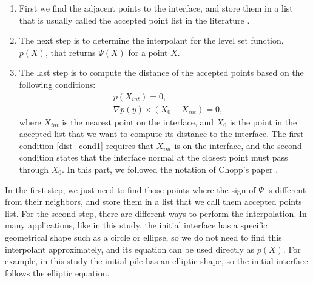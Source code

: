 \documentclass[review]{elsarticle}
\begin{document}
\begin{enumerate}
\item First we find the adjacent points to the interface, and store them in a list that is usually called the accepted point list in the literature \cite{Chopp2001}. 
\item The next step is to determine the interpolant for the level set function, $p(X)$, that returns $\varPsi(X)$ for a point $X$.
\item The last step is to compute the distance of the accepted points based on the following conditions:
\begin{subequations}
\begin{align}
&p(X_{int})=0,\label{dist_cond1} \\ 
&\nabla p(y) \times (X_0-X_{int})=0,\label{dist_cond2}
\end{align}
\end{subequations}
where $X_{int}$ is the nearest point on the interface, and $X_0$ is the point in the accepted list that we want to compute its distance to the interface. 
The first condition \eqref{dist_cond1} requires that $X_{int}$ is on the interface, and the second condition states that the interface normal at the closest point 
must pass through $X_0$. In this part, we followed the notation of Chopp's paper \citep{Chopp2001}.
\end{enumerate}

In the first step, we just need to find those points where the sign of $\varPsi$ is different from their neighbors, and store them in a list that we call them accepted points list. 
For the second step, there are different ways to perform the interpolation. In many applications, like in this study, the initial interface has a specific geometrical shape such as a circle or ellipse, 
so we do not need to find this interpolant approximately, and its equation can be used directly as $p(X)$. 
For example, in this study the initial pile has an elliptic shape, so the initial interface follows the elliptic equation. 
\end{document}
